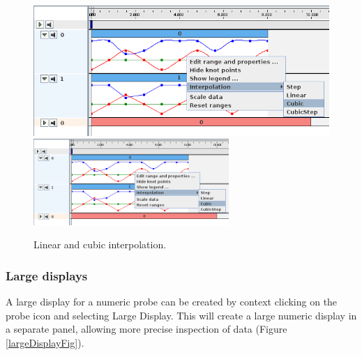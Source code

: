 \documentclass{article}
\begin{document}
\begin{figure}
\begin{center}
\iflatexml
\includegraphics[]{images/interpolation}
\else
\includegraphics[width=0.66\textwidth]{images/interpolation}
\fi
\end{center}
\caption{Linear and cubic interpolation.}%
\label{interpolationFig}
\end{figure}

\subsubsection{Large displays}

A large display for a numeric probe can be created by context clicking
on the probe icon and selecting {\sf Large Display}. This will create a
large numeric display in a separate panel, allowing more precise
inspection of data (Figure \ref{largeDisplayFig}).
\end{document}
